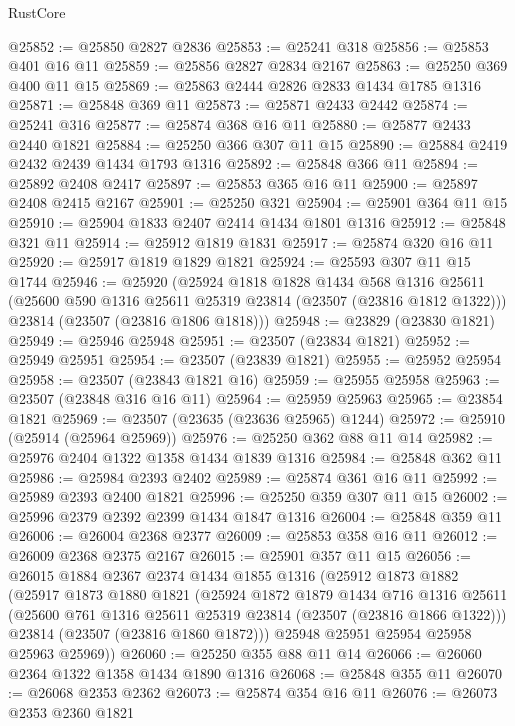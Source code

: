\begin{lexlean}{RustCore}
\begin{coremodule}
@25852 := @25850 @2827 @2836
@25853 := @25241 @318
@25856 := @25853 @401 @16 @11
@25859 := @25856 @2827 @2834 @2167
@25863 := @25250 @369 @400 @11 @15
@25869 := @25863 @2444 @2826 @2833 @1434 @1785 @1316
@25871 := @25848 @369 @11
@25873 := @25871 @2433 @2442
@25874 := @25241 @316
@25877 := @25874 @368 @16 @11
@25880 := @25877 @2433 @2440 @1821
@25884 := @25250 @366 @307 @11 @15
@25890 := @25884 @2419 @2432 @2439 @1434 @1793 @1316
@25892 := @25848 @366 @11
@25894 := @25892 @2408 @2417
@25897 := @25853 @365 @16 @11
@25900 := @25897 @2408 @2415 @2167
@25901 := @25250 @321
@25904 := @25901 @364 @11 @15
@25910 := @25904 @1833 @2407 @2414 @1434 @1801 @1316
@25912 := @25848 @321 @11
@25914 := @25912 @1819 @1831
@25917 := @25874 @320 @16 @11
@25920 := @25917 @1819 @1829 @1821
@25924 := @25593 @307 @11 @15 @1744
@25946 := @25920
    (@25924
      @1818
      @1828
      @1434
      @568
      @1316
      @25611
      (@25600 @590 @1316 @25611 @25319 @23814 (@23507 (@23816 @1812 @1322)))
      @23814
      (@23507 (@23816 @1806 @1818)))
@25948 := @23829 (@23830 @1821)
@25949 := @25946 @25948
@25951 := @23507 (@23834 @1821)
@25952 := @25949 @25951
@25954 := @23507 (@23839 @1821)
@25955 := @25952 @25954
@25958 := @23507 (@23843 @1821 @16)
@25959 := @25955 @25958
@25963 := @23507 (@23848 @316 @16 @11)
@25964 := @25959 @25963
@25965 := @23854 @1821
@25969 := @23507 (@23635 (@23636 @25965) @1244)
@25972 := @25910 (@25914 (@25964 @25969))
@25976 := @25250 @362 @88 @11 @14
@25982 := @25976 @2404 @1322 @1358 @1434 @1839 @1316
@25984 := @25848 @362 @11
@25986 := @25984 @2393 @2402
@25989 := @25874 @361 @16 @11
@25992 := @25989 @2393 @2400 @1821
@25996 := @25250 @359 @307 @11 @15
@26002 := @25996 @2379 @2392 @2399 @1434 @1847 @1316
@26004 := @25848 @359 @11
@26006 := @26004 @2368 @2377
@26009 := @25853 @358 @16 @11
@26012 := @26009 @2368 @2375 @2167
@26015 := @25901 @357 @11 @15
@26056 := @26015
    @1884
    @2367
    @2374
    @1434
    @1855
    @1316
    (@25912
      @1873
      @1882
      (@25917
        @1873
        @1880
        @1821
        (@25924
          @1872
          @1879
          @1434
          @716
          @1316
          @25611
          (@25600 @761 @1316 @25611 @25319 @23814 (@23507 (@23816 @1866 @1322)))
          @23814
          (@23507 (@23816 @1860 @1872)))
        @25948
        @25951
        @25954
        @25958
        @25963
        @25969))
@26060 := @25250 @355 @88 @11 @14
@26066 := @26060 @2364 @1322 @1358 @1434 @1890 @1316
@26068 := @25848 @355 @11
@26070 := @26068 @2353 @2362
@26073 := @25874 @354 @16 @11
@26076 := @26073 @2353 @2360 @1821

\end{coremodule}
\end{lexlean}
